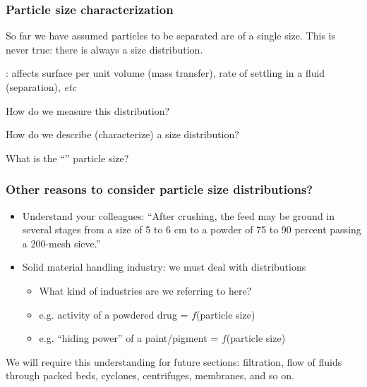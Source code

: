 \begin{frame}\frametitle{Particle size characterization}
	So far we have assumed particles to be separated are of a single size. This is never true: there is always a size distribution.

	\vspace{12pt}
	{\color{myGreen}{Particle size}}: affects surface per unit volume (mass transfer), rate of settling in a fluid (separation), \emph{etc}

	\vspace{12pt}
	\begin{exampleblock}{{\color{myRed}{Aims}}}
		\vspace{12pt}
		How do we measure this distribution?

		\vspace{12pt}
		How do we describe (characterize) a size distribution?
		
		\vspace{12pt}
		What is the ``\textbf{{\color{Brown}{average}}}'' particle size?
	\end{exampleblock}	
\end{frame}

\begin{frame}\frametitle{Other reasons to consider particle size distributions?}
	\begin{itemize}
		\item	Understand your colleagues: ``After crushing, the feed may be ground in several stages from a size of 5 to 6 cm to a powder of 75 to 90 percent passing a 200-mesh sieve.''
		\item	Solid material handling industry: we must deal with distributions
		\begin{itemize}
			\item	What kind of industries are we referring to here?
			\item	e.g. activity of a powdered drug = $f$(particle size)
			\item	e.g. ``hiding power'' of a paint/pigment = $f$(particle size)
		\end{itemize}
	\end{itemize}

	\vspace{12pt}
	\begin{exampleblock}{}
		We will require this understanding for future sections: filtration, flow of fluids through packed beds, cyclones, centrifuges, membranes, and so on.
	\end{exampleblock}
\end{frame}

